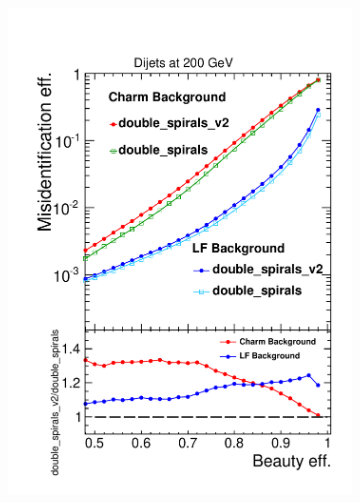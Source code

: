 \begin{figure}[H]
        \begin{subfigure}[b]{0.5\textwidth}
          \centering
          \includegraphics[width=\textwidth]{Figures/ImpactOfGeometries/heavy_general_200_Beauty.pdf}
          \caption{}
          \label{}
        \end{subfigure}%
        ~ 
        \begin{subfigure}[b]{0.5\textwidth}
          \centering

\end{subfigure}
\end{figure}
